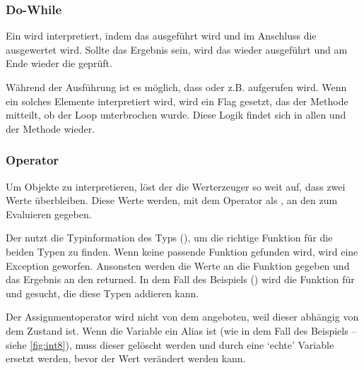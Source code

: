 {    %
    \subsubsection{Do-While}
    \label{sssec:Do-While}
      Ein  wird interpretiert, indem das  ausgeführt wird und im Anschluss die  ausgewertet wird. Sollte das Ergebnis  sein, wird das  wieder ausgeführt und am Ende wieder die  geprüft.

      Während der Ausführung ist es möglich, dass  oder z.B.  aufgerufen wird. Wenn ein solches Elemente interpretiert wird, wird ein Flag gesetzt, das der  Methode mitteilt, ob der Loop unterbrochen wurde. Diese Logik findet sich in allen  und der  Methode wieder.

    \subsubsection{Operator}
    \label{sssec:Operator}
      Um  Objekte zu interpretieren, löst der  die Werterzeuger so weit auf, dass zwei  Werte überbleiben. Diese Werte werden, mit dem Operator als , an den  zum Evaluieren gegeben.

      Der  nutzt die Typinformation des  Typs (), um die richtige Funktion für die beiden Typen zu finden. Wenn keine passende Funktion gefunden wird, wird eine Exception geworfen. Ansonsten werden die Werte an die Funktion gegeben und das Ergebnis an den  returned. In dem Fall des Beispiels () wird die Funktion für  und  gesucht, die diese Typen addieren kann.

      Der Assignmentoperator wird nicht von dem  angeboten, weil dieser abhängig von dem  Zustand ist. Wenn die Variable ein Alias ist (wie in dem Fall des Beispiels -- siehe \autoref{fig:int8}), muss dieser gelöscht werden und durch eine `echte' Variable ersetzt werden, bevor der Wert verändert werden kann.

}
